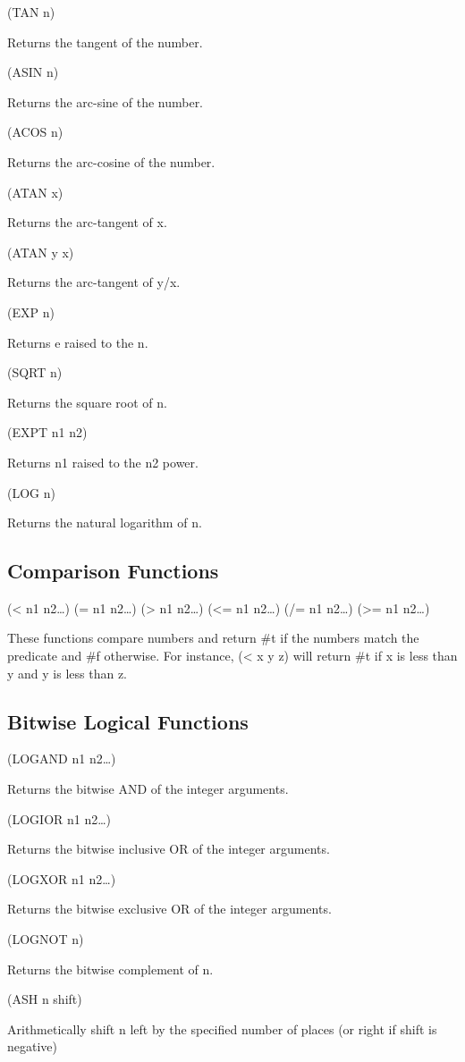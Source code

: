 \documentclass[11pt]{article}
\begin{document}
(TAN n)

Returns the tangent of the number.

(ASIN n)

Returns the arc-sine of the number.

(ACOS n)

Returns the arc-cosine of the number.

(ATAN x)

Returns the arc-tangent of x.

(ATAN y x)

Returns the arc-tangent of y/x.

(EXP n)

Returns e raised to the n.

(SQRT n)

Returns the square root of n.

(EXPT n1 n2)

Returns n1 raised to the n2 power.

(LOG n)

Returns the natural logarithm of n.
\subsection{Comparison Functions}
\label{sec-1-28}

(< n1 n2\ldots{})
(= n1 n2\ldots{})
(> n1 n2\ldots{})
(<= n1 n2\ldots{})
(/= n1 n2\ldots{})
(>= n1 n2\ldots{})

These functions compare numbers and return \#t if the numbers match the
predicate and \#f otherwise. For instance, (< x y z) will return \#t if x
is less than y and y is less than z.
\subsection{Bitwise Logical Functions}
\label{sec-1-29}

(LOGAND n1 n2\ldots{})

Returns the bitwise AND of the integer arguments.

(LOGIOR n1 n2\ldots{})

Returns the bitwise inclusive OR of the integer arguments.

(LOGXOR n1 n2\ldots{})

Returns the bitwise exclusive OR of the integer arguments.

(LOGNOT n)

Returns the bitwise complement of n.

(ASH n shift)

Arithmetically shift n left by the specified number of places (or right
if shift is negative)
\end{document}
